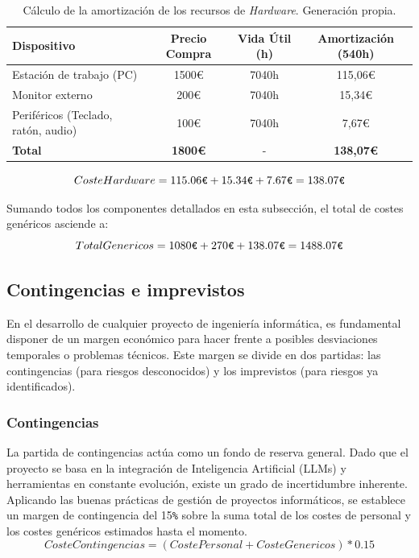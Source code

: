 \documentclass[11pt, letterpaper]{article}
\begin{document}
\begin{table}[H]
    \centering
    \begin{tabularx}{\textwidth}{|X|c|c|c|}
         \hline
         \textbf{Dispositivo} & \textbf{Precio Compra} & \textbf{Vida Útil (h)} & \textbf{Amortización (540h)} \\ 
         \hline
         \hline
         Estación de trabajo (PC) & 1500€ & 7040h & 115,06€ \\
         Monitor externo & 200€ & 7040h & 15,34€ \\
         Periféricos (Teclado, ratón, audio) & 100€ & 7040h & 7,67€ \\
         \hline
         \textbf{Total} & \textbf{1800€} & - & \textbf{138,07€} \\
         \hline
    \end{tabularx}
    \caption{Cálculo de la amortización de los recursos de \textit{Hardware}. Generación propia.}
    \label{tab:amortizacion_hardware}
\end{table}

\begin{equation}
    Coste Hardware = 115{.}06\verb|€| + 15{.}34\verb|€| + 7{.}67\verb|€| = 138{.}07\verb|€|
\end{equation}

Sumando todos los componentes detallados en esta subsección, el total de costes genéricos asciende a:
\begin{equation}
    Total Genericos = 1080\verb|€| + 270\verb|€| + 138{.}07\verb|€| = 1488{.}07\verb|€|
\end{equation}

\subsection{Contingencias e imprevistos}
\label{sec:imprevistos}
En el desarrollo de cualquier proyecto de ingeniería informática, es fundamental disponer de un margen económico para hacer frente a posibles desviaciones temporales o problemas técnicos. Este margen se divide en dos partidas: las contingencias (para riesgos desconocidos) y los imprevistos (para riesgos ya identificados).

\subsubsection{Contingencias}
La partida de contingencias actúa como un fondo de reserva general. Dado que el proyecto se basa en la integración de Inteligencia Artificial (LLMs) y herramientas en constante evolución, existe un grado de incertidumbre inherente. Aplicando las buenas prácticas de gestión de proyectos informáticos, se establece un margen de contingencia del 15\verb|%| sobre la suma total de los costes de personal y los costes genéricos estimados hasta el momento.
\begin{equation}
    Coste Contingencias = (Coste Personal + Coste Genericos) * 0{.}15
\end{equation}
\end{document}
